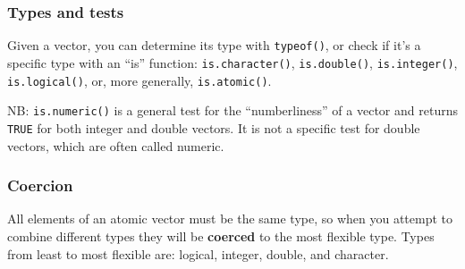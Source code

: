 \subsubsection{Types and tests}

Given a vector, you can determine its type with \texttt{typeof()}, or
check if it's a specific type with an ``is'' function:
\texttt{is.character()}, \texttt{is.double()}, \texttt{is.integer()},
\texttt{is.logical()}, or, more generally, \texttt{is.atomic()}.

\begin{Shaded}
\begin{Highlighting}[]
\StringTok{ }

\StringTok{ }\NormalTok{(}\NormalTok{, }\NormalTok{, }\NormalTok{)}
\end{Highlighting}
\end{Shaded}

NB: \texttt{is.numeric()} is a general test for the ``numberliness'' of
a vector and returns \texttt{TRUE} for both integer and double vectors.
It is not a specific test for double vectors, which are often called
numeric. 

\begin{Shaded}
\begin{Highlighting}[]
\end{Highlighting}
\end{Shaded}

\subsubsection{Coercion}

All elements of an atomic vector must be the same type, so when you
attempt to combine different types they will be \textbf{coerced} to the
most flexible type. Types from least to most flexible are: logical,
integer, double, and character. 

